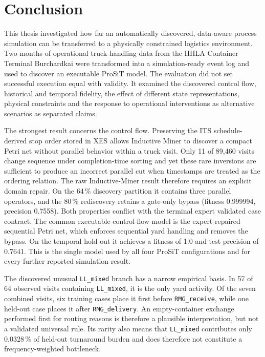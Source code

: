 \chapter{Conclusion}
\label{chp:conclusion}

This thesis investigated how far an automatically discovered, data-aware
process simulation can be transferred to a physically constrained logistics
environment. Two months of operational truck-handling data from the HHLA
Container Terminal Burchardkai were transformed into a simulation-ready event
log and used to discover an executable ProSiT model. The evaluation did not
set successful execution equal with validity. It examined the discovered control
flow, historical and temporal fidelity, the effect of different state
representations, physical constraints and the response to  operational
interventions as alternative scenarios as separated claims.

The strongest result concerns the control flow. Preserving the ITS
schedule-derived stop order stored in XES allows Inductive Miner to discover a
compact Petri net without parallel behavior within a truck visit. Only 11 of
89,460 visits change sequence under completion-time sorting and yet these rare
inversions are sufficient to produce an incorrect parallel cut when timestamps
are treated as the ordering relation. The raw Inductive-Miner result therefore
requires an explicit domain repair. On the 64\,\% discovery partition it
contains three parallel operators, and the 80\,\% rediscovery retains a
gate-only bypass (fitness 0.999994, precision 0.7558). Both properties
conflict with the terminal expert validated case contract. The common executable
control-flow model is the expert-repaired sequential Petri net, which enforces sequential yard
handling and removes the bypass. On the temporal hold-out it achieves a fitness of 
1.0 and test precision of 0.7641.  This is the single model used by all four
ProSiT configurations and for every further reported simulation result.

The discovered unusual \texttt{LL\_mixed} branch has a narrow empirical basis. In 57 of
64 observed visits containing \texttt{LL\_mixed}, it is the only yard activity.
Of the seven combined visits, six training cases place it first before
\texttt{RMG\_receive}, while one held-out case places it after
\texttt{RMG\_delivery}. An empty-container exchange performed first for routing
reasons is therefore a plausible interpretation, but not a validated universal
rule. Its rarity also means that \texttt{LL\_mixed} contributes only
0.0328\,\% of held-out turnaround burden and does therefore not constitute a
frequency-weighted bottleneck.

